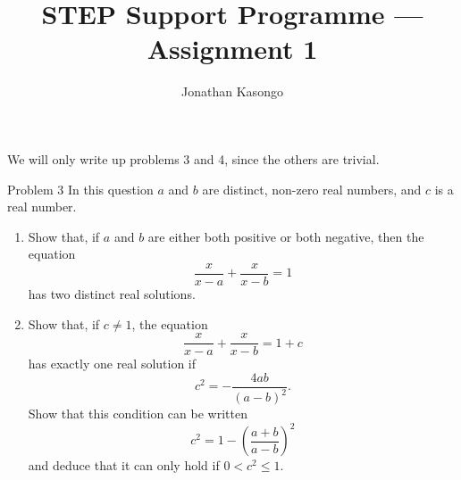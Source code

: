 \documentclass{article}
\title{STEP Support Programme --- Assignment 1}
\author{Jonathan Kasongo}
\begin{document}
\maketitle

We will only write up problems 3 and 4, since the others are trivial.

\begin{problem}{Problem 3}
In this question \(a\) and \(b\) are distinct, non-zero real numbers, and \(c\) is a real number.

\begin{enumerate}
    \item[(i)] Show that, if \(a\) and \(b\) are either both positive or both negative, then the equation
    \[
    \frac{x}{x - a} + \frac{x}{x - b} = 1
    \]
    has two distinct real solutions.

    \item[(ii)] Show that, if \(c \neq 1\), the equation
    \[
    \frac{x}{x - a} + \frac{x}{x - b} = 1 + c
    \]
    has exactly one real solution if
    \[
    c^2 = - \frac{4ab}{(a - b)^2}.
    \]
    Show that this condition can be written
    \[
    c^2 = 1 - \left( \frac{a + b}{a - b} \right)^2
    \]
    and deduce that it can only hold if \(0 < c^2 \leq 1\).
\end{enumerate}
\end{problem}
\end{document}
